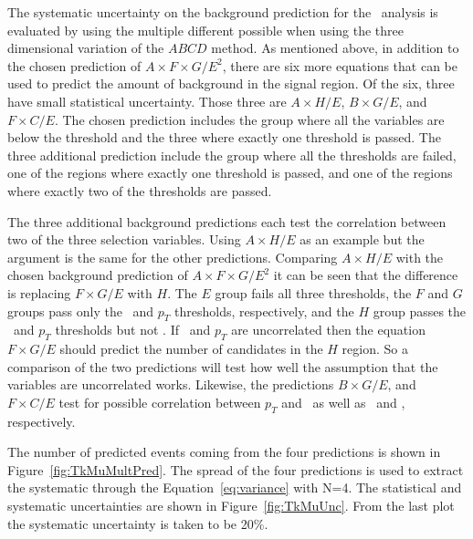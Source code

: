The systematic uncertainty on the background prediction for the \tktof\ analysis is evaluated by using the multiple different possible when using the
three dimensional variation of the $ABCD$ method. As mentioned above, in addition to the chosen prediction of $A\times F\times G/E^2$, 
there are six more equations that can be used to predict
the amount of background in the signal region. Of the six, three have small statistical uncertainty. Those three are $A \times H/E$, $B \times G/E$, and $F \times C/E$.
The chosen prediction includes the group where all the variables are below the threshold and the three where exactly one threshold is passed. The three additional prediction
include the group where all the thresholds are failed, one of the regions where exactly one threshold is passed, and one of the regions where exactly two of the
thresholds are passed.

The three additional background predictions each test the correlation between two of the three selection variables. Using $A \times H/E$ as an example but
the argument is the same for the other predictions. Comparing $A \times H/E$ with the chosen background prediction of $A\times F\times G/E^2$ it can be seen that
the difference is replacing $F\times G/E$ with $H$. The $E$ group fails all three thresholds, the $F$ and $G$ groups pass only the \invbeta\ and $p_T$ thresholds,
respectively, and the $H$ group passes the \invbeta\ and $p_T$ thresholds but not \dedx. If \invbeta\ and $p_T$ are uncorrelated then the equation $F\times G/E$ should
predict the number of candidates in the $H$ region. So a comparison of the two predictions will test how well the assumption that the variables are uncorrelated works.
Likewise, the predictions $B \times G/E$, and $F \times C/E$ test for possible correlation between $p_T$ and \dedx\ as well as \invbeta\ and \dedx, respectively.

The number of predicted events coming from the four predictions is shown in Figure~\ref{fig:TkMuMultPred}. The spread of the four predictions is used to extract 
the systematic through the Equation~\ref{eq:variance} with N=4. The statistical and systematic uncertainties are shown in Figure~\ref{fig:TkMuUnc}. From the last plot
the systematic uncertainty is taken to be 20\%.

